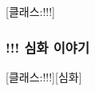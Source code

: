 \documentclass{report}
\begin{document}
	\begin{story}{}{[클래스:!!!]}
		
	\end{story}
	
	\subsubsection*{!!! 심화 이야기}
		\begin{story}{}{[클래스:!!!][심화]}
			
		\end{story}
\end{document}
